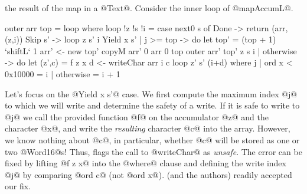 the result of the map in a @Text@. Consider the inner loop of @mapAccumL@.
%
\begin{code}
  outer arr top = loop
   where
    loop !z !s !i =
      case next0 s of
        Done          -> return (arr, (z,i))
        Skip s'       -> loop z s' i
        Yield x s'
          | j >= top  -> do
            let top' = (top + 1) `shiftL` 1
            arr' <- new top'
            copyM arr' 0 arr 0 top
            outer arr' top' z s i
          | otherwise -> do
            let (z',c) = f z x
            d <- writeChar arr i c
            loop z' s' (i+d)
          where j | ord x < 0x10000 = i
                  | otherwise       = i + 1
\end{code}
%
Let's focus on the @Yield x s'@ case.
%
We first compute the maximum index @j@ to 
which we will write and determine the safety of a write. 
%
If it is safe to write to @j@ we call the provided 
function @f@ on the accumulator @z@ and the character 
@x@, and write the \emph{resulting} character @c@ into the array. 
%
However, we know nothing about @c@, in particular, 
whether @c@ will be stored as one or two @Word16@s! 
Thus, \toolname flags the call to @writeChar@ as \emph{unsafe}.
The error can be fixed by lifting @f z x@ into the @where@ clause and defining the
write index @j@ by comparing @ord c@ (not @ord x@). \toolname (and the authors)
readily accepted our fix.

